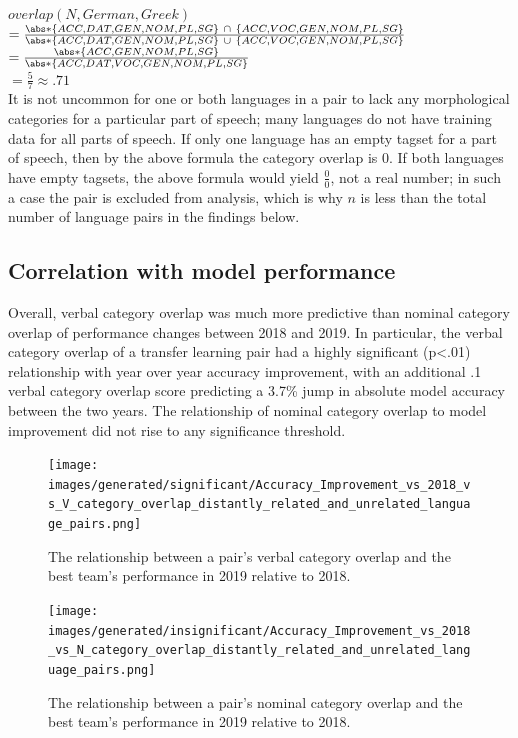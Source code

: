 $overlap(N, German, Greek)$\\
$= \frac{\abs*{\{ACC, DAT, GEN, NOM, PL, SG\}\ \cap\ \{ACC, VOC, GEN, NOM, PL, SG\}}}{\abs*{\{ACC, DAT, GEN, NOM, PL, SG\}\ \cup\ \{ACC, VOC, GEN, NOM, PL, SG\}}}$\\
$= \frac{\abs*{\{ACC, GEN, NOM, PL, SG\}}}{\abs*{\{ACC, DAT, VOC, GEN, NOM, PL, SG\}}}$\\
$= \frac{5}{7} \approx .71$\\

It is not uncommon for one or both languages in a pair to lack any morphological categories for a particular part of speech; many languages do not have training data for all parts of speech. If only one language has an empty tagset for a part of speech, then by the above formula the category overlap is 0. If both languages have empty tagsets, the above formula would yield $\frac{0}{0}$, not a real number; in such a case the pair is excluded from analysis, which is why $n$ is less than the total number of language pairs in the findings below.

\subsection{Correlation with model performance}

Overall, verbal category overlap was much more predictive than nominal category overlap of performance changes between 2018 and 2019. In particular, the verbal category overlap of a transfer learning pair had a highly significant (p<.01) relationship with year over year accuracy improvement, with an additional .1 verbal category overlap score predicting a 3.7\% jump in absolute model accuracy between the two years. The relationship of nominal category overlap to model improvement did not rise to any significance threshold.

\begin{figure}[ht]
\texttt{[image: images/generated/significant/Accuracy\_Improvement\_vs\_2018\_vs\_V\_category\_overlap\_distantly\_related\_and\_unrelated\_language\_pairs.png]}
\centering
\caption{The relationship between a pair's verbal category overlap and the best team's performance in 2019 relative to 2018.}
\end{figure}

\begin{figure}[ht]
\texttt{[image: images/generated/insignificant/Accuracy\_Improvement\_vs\_2018\_vs\_N\_category\_overlap\_distantly\_related\_and\_unrelated\_language\_pairs.png]}
\centering
\caption{The relationship between a pair's nominal category overlap and the best team's performance in 2019 relative to 2018.}
\end{figure}

